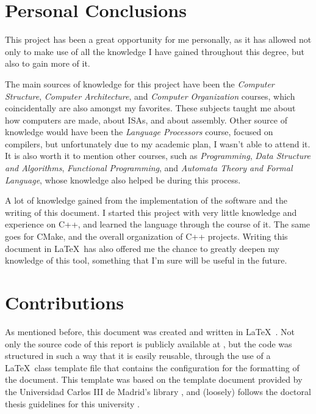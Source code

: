 \section{Personal Conclusions}\label{sec:personal-conclusions}
This project has been a great opportunity for me personally, as it has allowed not only to make use of all the knowledge I have gained throughout this degree, but also to gain more of it.

The main sources of knowledge for this project have been the \textit{Computer Structure}, \textit{Computer Architecture}, and \textit{Computer Organization} courses, which coincidentally are also amongst my favorites. These subjects taught me about how computers are made, about \glspl{ISA}, and about \gls{assembly}. Other source of knowledge would have been the \textit{Language Processors} course, focused on compilers, but unfortunately due to my academic plan, I wasn't able to attend it.
It is also worth it to mention other courses, such as \textit{Programming}, \textit{Data Structure and Algorithms}, \textit{Functional Programming}, and \textit{Automata Theory and Formal Language}, whose knowledge also helped be during this process.

A lot of knowledge gained from the implementation of the software and the writing of this document. I started this project with very little knowledge and experience on C++, and learned the language through the course of it. The same goes for CMake, and the overall organization of C++ projects. Writing this document in \LaTeX~has also offered me the chance to greatly deepen my knowledge of this tool, something that I'm sure will be useful in the future.



\section{Contributions}\label{sec:contributions}
As mentioned before, this document was created and written in \LaTeX~\parencite{lamport1986latex}. Not only the source code of this report is publicly available at \myrepo, but the code was structured in such a way that it is easily reusable, through the use of a \LaTeX~class template file that contains the configuration for the formatting of the document. This template was based on the template document provided by the Universidad Carlos III de Madrid's library \parencite{UC3MthesisTemplate}, and (loosely) follows the doctoral thesis guidelines for this university \parencite{UC3MthesisStyleGuide}.

